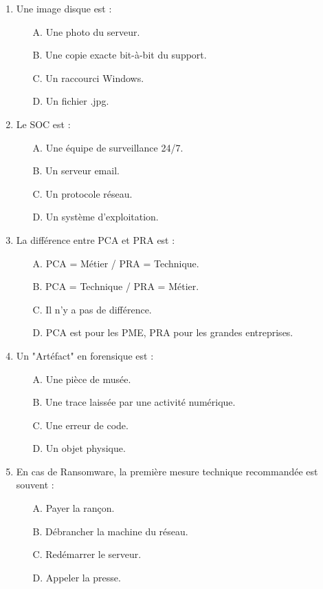 \begin{enumerate}
    \item Une image disque est :
    \begin{itemize}
        \item[A.] Une photo du serveur.
        \item[B.] Une copie exacte bit-à-bit du support.
        \item[C.] Un raccourci Windows.
        \item[D.] Un fichier .jpg.
    \end{itemize}

    \item Le SOC est :
    \begin{itemize}
        \item[A.] Une équipe de surveillance 24/7.
        \item[B.] Un serveur email.
        \item[C.] Un protocole réseau.
        \item[D.] Un système d'exploitation.
    \end{itemize}

    \item La différence entre PCA et PRA est :
    \begin{itemize}
        \item[A.] PCA = Métier / PRA = Technique.
        \item[B.] PCA = Technique / PRA = Métier.
        \item[C.] Il n'y a pas de différence.
        \item[D.] PCA est pour les PME, PRA pour les grandes entreprises.
    \end{itemize}

    \item Un "Artéfact" en forensique est :
    \begin{itemize}
        \item[A.] Une pièce de musée.
        \item[B.] Une trace laissée par une activité numérique.
        \item[C.] Une erreur de code.
        \item[D.] Un objet physique.
    \end{itemize}

    \item En cas de Ransomware, la première mesure technique recommandée est souvent :
    \begin{itemize}
        \item[A.] Payer la rançon.
        \item[B.] Débrancher la machine du réseau.
        \item[C.] Redémarrer le serveur.
        \item[D.] Appeler la presse.
    \end{itemize}
\end{enumerate}

